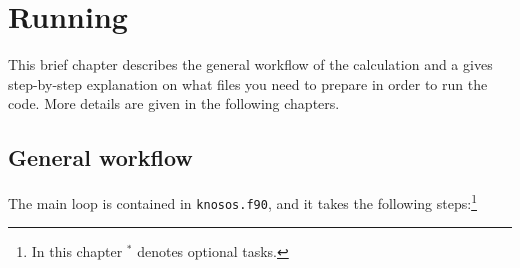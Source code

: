 \chapter{Running \KNOSOS}\label{CHAP_RUN}

This brief chapter describes the general workflow of the calculation and a gives step-by-step explanation on what files you need to prepare in order to run the code. More details are given in the following chapters.


\section{General workflow}\label{SEC_WORKFLOW}

The main loop is contained in \texttt{knosos.f90}, and it takes the following steps:\footnote{In this chapter $^*$ denotes optional tasks.}

